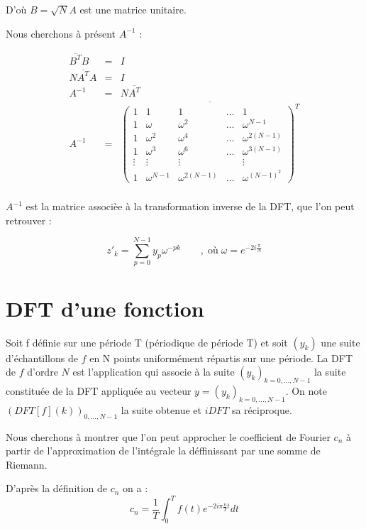\documentclass[a4paper,12pt]{report}
\begin{document}
	D'o\`u $B=\sqrt{N}A$ est une matrice unitaire.

	Nous cherchons \`a pr\'esent $A^{-1}$ :

	\begin{eqnarray*}
		\overline{B^{T}}B&=&I\\
		N\overline{A^{T}}A&=&I\\
		A^{-1}&=&N\overline{A^{T}}\\
		A^{-1}&=&\overline{\left(
								\begin{array}{lllll}
									1&1&1& \ldots&1\\
									1&\omega&\omega^2&\ldots&\omega^{N-1}\\
									1&\omega^2&\omega^4&\ldots&\omega^{2(N-1)}\\
									1&\omega^3&\omega^6&\ldots&\omega^{3(N-1)}\\
									\vdots&\vdots&\vdots&&\vdots\\
									1&\omega^{N-1}&\omega^{2(N-1)}&\ldots&\omega^{(N-1)^2}
								\end{array}
								\right)^{T}}\\
	\end{eqnarray*}

	$A^{-1}$ est la matrice associ\`ee \`a la transformation inverse de la DFT, que l'on peut retrouver :

	\begin{equation}
		z'_k=\sum_{p=0}^{N-1}y_p\omega^{-pk}\qquad,\;\text{o\`u}\;\omega=e^{-2i\frac{\pi}{N}}
	\end{equation}


	\section{DFT d'une fonction}

	Soit f d\'efinie sur une p\'eriode T (p\'eriodique de p\'eriode T) et soit $(y_{k})$ une suite d'\'echantillons de $f$ en N points uniform\'ement r\'epartis sur une p\'eriode. La DFT de $f$ d'ordre $N$ est l'application qui associe \`a la suite $(y_{k})_{k=0,...,N-1}$ la suite constitu\'ee de la DFT appliqu\'ee au vecteur $y = (y_{k})_{k=0,...,N-1}$. On note $(DFT[f](k))_{0,...,N-1}$ la suite obtenue et $iDFT$ sa r\'eciproque.

	Nous cherchons \`a montrer que l'on peut approcher le coefficient de Fourier $c_{n}$ \`a partir de l'approximation de l'int\'egrale la d\'effinissant par une somme de Riemann.

	D'apr\`es la d\'efinition de $c_{n}$ on a : \[c_{n}=\frac{1}{T}\int_{0}^{T}f(t)e^{-2i\pi \frac{n}{T}t}dt\]
\end{document}
